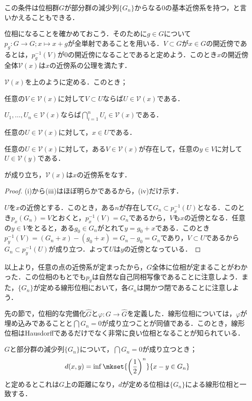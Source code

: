 この条件は位相群$G$が部分群の減少列$\{G_n\}$からなる$0$の基本近傍系を持つ，と言いかえることもできる．

位相になることを確かめておこう．そのために$g\in G$について$p_g:G\to G;x\mapsto x+g$が全単射であることを用いる．$V\subset G$が$x\in G$の開近傍であるとは，$p_g^{-1}(V)$が$0$の開近傍になることであると定めよう．このとき$x$の開近傍全体$\mathcal{V}(x)$は$x$の近傍系の公理を満たす．

\begin{lem}
	$\mathcal{V}(x)$を上のように定める．このとき；
	\begin{sakura}
		\item 任意の$V\in\mathcal{V}(x)$に対して$V\subset U$ならば$U\in\mathcal{V}(x)$である．
		\item $U_1,\dots,U_n\in\mathcal{V}(x)$ならば$\bigcap_{i=1}^n U_i\in\mathcal{V}(x)$である．
		\item 任意の$U\in\mathcal{V}(x)$に対して，$x\in U$である．
		\item 任意の$U\in\mathcal{V}(x)$に対して，ある$V\in\mathcal{V}(x)$が存在して，任意の$y\in V$に対して$U\in\mathcal{V}(y)$である．
	\end{sakura}
	が成り立ち，$\mathcal{V}(x)$は$x$の近傍系をなす．
\end{lem}

\begin{proof}
	(i)から(iii)はほぼ明らかであるから，(iv)だけ示す．
	
	$U$を$x$の近傍とする．このとき，ある$n$が存在して$G_n\subset p_x^{-1}(U)$となる．このとき$p_x(G_n)=V$とおくと，$p_x^{-1}(V)=G_n$であるから，$V$も$x$の近傍となる．任意の$y\in V$をとると，ある$g_0\in G_n$がとれて$y=g_0+x$である．このとき$p_y^{-1}(V)=(G_n+x)-(g_0+x)=G_n-g_0=G_n$であり，$V\subset U$であるから$G_n\subset p_y^{-1}(U)$が成り立つ．よって$U$は$y$の近傍となっている．
\end{proof}

以上より，任意の点の近傍系が定まったから，$G$全体に位相が定まることがわかった．この位相のもとでも$p_g$は自然な自己同相写像であることに注意しよう．また，$\{G_n\}$が定める線形位相において，各$G_n$は開かつ閉であることに注意しよう．

先の節で，位相的な完備化$\widehat{G}$と$\varphi:G\to\widehat{G}$を定義した．線形位相については，$\varphi$が埋め込みであることと$\bigcap G_n=0$が成り立つことが同値である．このとき，線形位相はHausdorffであるだけでなく非常に良い位相となることが知られている．

\begin{prop}
	$G$と部分群の減少列$\{G_n\}$について，$\bigcap G_n=0$が成り立つとき；
	\[d(x,y)=\inf\mkset{\left(\frac{1}{2}\right)^n}{x-y\in G_n}\]
	と定めるとこれは$G$上の距離になり，$d$が定める位相は$\{G_n\}$による線形位相と一致する．
\end{prop}

